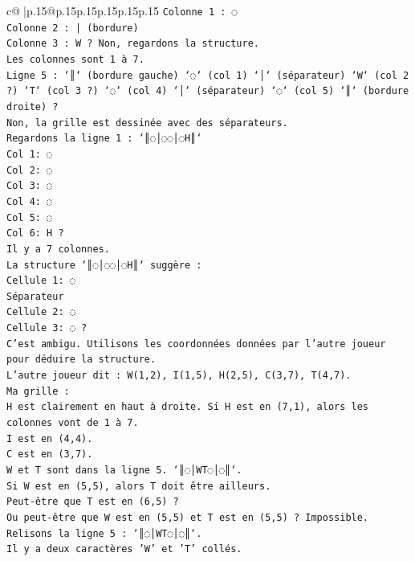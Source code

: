 \documentclass{article}
\begin{document}
{\begin{supertabular}{c@{$\;$}|p{.15\linewidth}@{}p{.15\linewidth}p{.15\linewidth}p{.15\linewidth}p{.15\linewidth}p{.15\linewidth}}
{{{\texttt{Colonne 1 : ◌} \\
\texttt{Colonne 2 : | (bordure)} \\
\texttt{Colonne 3 : W ? Non, regardons la structure.} \\
\texttt{Les colonnes sont 1 à 7.} \\
\texttt{Ligne 5 : `║` (bordure gauche) `◌` (col 1) `│` (séparateur) `W` (col 2 ?) `T` (col 3 ?) `◌` (col 4) `│` (séparateur) `◌` (col 5) `║` (bordure droite) ?} \\
\texttt{Non, la grille est dessinée avec des séparateurs.} \\
\texttt{Regardons la ligne 1 : `║◌│◌◌│◌H║`} \\
\texttt{Col 1: ◌} \\
\texttt{Col 2: ◌} \\
\texttt{Col 3: ◌} \\
\texttt{Col 4: ◌} \\
\texttt{Col 5: ◌} \\
\texttt{Col 6: H ?} \\
\texttt{Il y a 7 colonnes.} \\
\texttt{La structure `║◌│◌◌│◌H║` suggère :} \\
\texttt{Cellule 1: ◌} \\
\texttt{Séparateur} \\
\texttt{Cellule 2: ◌} \\
\texttt{Cellule 3: ◌ ?} \\
\texttt{C'est ambigu. Utilisons les coordonnées données par l'autre joueur pour déduire la structure.} \\
\texttt{L'autre joueur dit : W(1,2), I(1,5), H(2,5), C(3,7), T(4,7).} \\
\texttt{Ma grille :} \\
\texttt{H est clairement en haut à droite. Si H est en (7,1), alors les colonnes vont de 1 à 7.} \\
\texttt{I est en (4,4).} \\
\texttt{C est en (3,7).} \\
\texttt{W et T sont dans la ligne 5. `║◌│WT◌│◌║`.} \\
\texttt{Si W est en (5,5), alors T doit être ailleurs.} \\
\texttt{Peut{-}être que T est en (6,5) ?} \\
\texttt{Ou peut{-}être que W est en (5,5) et T est en (5,5) ? Impossible.} \\
\texttt{Relisons la ligne 5 : `║◌│WT◌│◌║`.} \\
\texttt{Il y a deux caractères 'W' et 'T' collés.} \\
}}}
\end{supertabular}}
\end{document}
